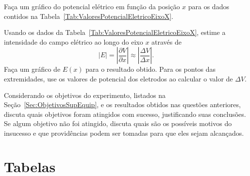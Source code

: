 \begin{question}[type={exam}]{2}
Faça um gráfico do potencial elétrico em função da posição $x$ para os dados contidos na Tabela~\ref{Tab:ValoresPotencialEletricoEixoX}.
\end{question}

\begin{question}[type={exam}]{2}
Usando os dados da Tabela~\ref{Tab:ValoresPotencialEletricoEixoX}, estime a intensidade do campo elétrico ao longo do eixo $x$ através de
\begin{equation}
    |E| = \left|\frac{\partial V}{\partial x}\right| \approx \left|\frac{\Delta V}{\Delta x}\right|.
\end{equation}
%
Faça um gráfico de $E(x)$ para o resultado obtido. Para os pontos das extremidades, use os valores de potencial dos eletrodos ao calcular o valor de $\Delta V$.
\end{question}

\begin{question}[type={exam}]{2}
Considerando os objetivos do experimento, listados na Seção~\ref{Sec:ObjetivosSupEquip}, e os resultados obtidos nas questões anteriores, discuta quais objetivos foram atingidos com sucesso, justificando suas conclusões. Se algum objetivo não foi atingido, discuta quais são os possíveis motivos do insucesso e que providências podem ser tomadas para que eles sejam alcançados.
\end{question}

\vfill
\pagebreak
\section{Tabelas}


